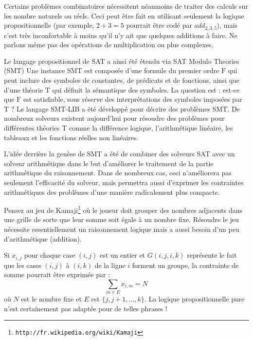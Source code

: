 



Certains problèmes combinatoires nécessitent néanmoins de traiter des calculs sur les nombre naturels ou réels. Ceci peut être fait en utilisant seulement la logique propositionnelle (par exemple, $2+3=5$ pourrait être codé par $add_{2,3,5}$), mais c'est très inconfortable à moins qu'il n'y ait que quelques additions à faire. Ne parlons même pas des opérations de multiplication ou plus complexes. 

Le langage propositionnel de SAT a ainsi été étendu via SAT Modulo Theories (SMT) \cite{DBLP:journals/jacm/NieuwenhuisOT06}
Une instance SMT est composée d'une formule du premier ordre $\mathrm{F}$ qui peut inclure des symboles de constantes, de prédicats et de fonctions, ainsi que d'une théorie $\mathrm{T}$ qui définit la sémantique des symboles. La question est : est-ce que $\mathrm{F}$ est satisfiable, sous réserve des interprétations des symboles imposées par $\mathrm{T}$ ?
Le langage SMT-LIB \cite{BarFT-SMTLIB} a été développé pour décrire des problèmes SMT. De nombreux solveurs existent aujourd'hui pour résoudre des problèmes pour différentes théories $\mathrm{T}$ comme la différence logique, l'arithmétique linéaire, les tableaux et les fonctions réelles non linéaires. 

L'idée derrière la genèse de SMT a été de combiner des solveurs SAT avec un solveur arithmétique dans le but d'améliorer le traitement de la partie arithmétique du raisonnement. Dans de nombreux cas, ceci n'améliorera pas seulement l'efficacité du solveur, mais permettra aussi d'exprimer les contraintes arithmétiques des problèmes d'une manière radicalement plus compacte.

Pensez au jeu de Kamaji\footnote{\texttt{http://fr.wikipedia.org/wiki/Kamaji}}  où le joueur doit grouper des nombres adjacents dans une grille de sorte que leur somme soit égale à un nombre fixe. Résoudre le jeu nécessite essentiellement un raisonnement logique mais a aussi besoin d'un peu d'arithmétique (addition).


Si $x_{i,j}$ pour chaque case $(i,j)$ est un entier et $G(i,j,i,k)$ représente le fait que les cases $(i,j)$ à $(i,k)$ de la ligne $i$ forment un groupe, la contrainte de somme pourrait être exprimée par :
$$\sum_{m\in E}x_{i,m}=N$$
où $N$ est le nombre fixe et $E$ est $\{j,j+1,\ldots,k\}$. La logique propositionnelle pure n'est certainement pas adaptée pour de telles phrases !